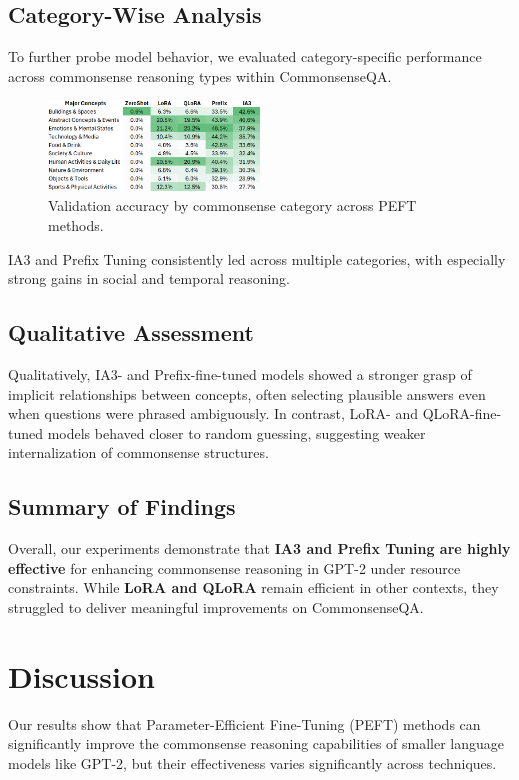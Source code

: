 \documentclass[11pt,twocolumn]{article}
\begin{document}
\subsection{Category-Wise Analysis}
To further probe model behavior, we evaluated category-specific performance across commonsense reasoning types within CommonsenseQA.

\begin{figure}[h]
\centering
\includegraphics[width=0.5\textwidth]{../graphs/Categorical_Performance.png}
\caption{Validation accuracy by commonsense category across PEFT methods.}
\label{fig:category-accuracy}
\end{figure}

IA3 and Prefix Tuning consistently led across multiple categories, with especially strong gains in social and temporal reasoning.

\subsection{Qualitative Assessment}
Qualitatively, IA3- and Prefix-fine-tuned models showed a stronger grasp of implicit relationships between concepts, often selecting plausible answers even when questions were phrased ambiguously. In contrast, LoRA- and QLoRA-fine-tuned models behaved closer to random guessing, suggesting weaker internalization of commonsense structures.

\subsection{Summary of Findings}
Overall, our experiments demonstrate that \textbf{IA3 and Prefix Tuning are highly effective} for enhancing commonsense reasoning in GPT-2 under resource constraints. While \textbf{LoRA and QLoRA} remain efficient in other contexts, they struggled to deliver meaningful improvements on CommonsenseQA.




\section{Discussion}
\label{sec:discussion}
Our results show that Parameter-Efficient Fine-Tuning (PEFT) methods can significantly improve the commonsense reasoning capabilities of smaller language models like GPT-2, but their effectiveness varies significantly across techniques.
\end{document}
